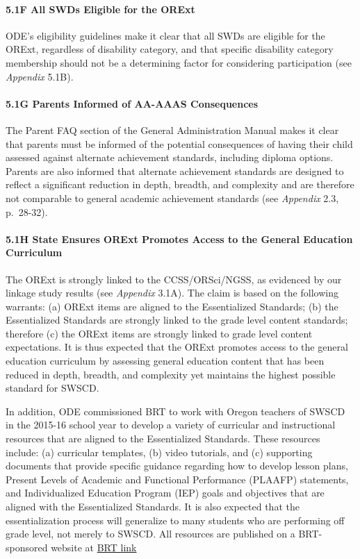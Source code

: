 \documentclass[]{article}
\let\oldparagraph\paragraph
\renewcommand{\paragraph}[1]{\oldparagraph{#1}\mbox{}}
\begin{document}
\paragraph{5.1F All SWDs Eligible for the
ORExt}\label{f-all-swds-eligible-for-the-orext}

ODE's eligibility guidelines make it clear that all SWDs are eligible
for the ORExt, regardless of disability category, and that specific
disability category membership should not be a determining factor for
considering participation (see \emph{Appendix} 5.1B).

\paragraph{5.1G Parents Informed of AA-AAAS
Consequences}\label{g-parents-informed-of-aa-aaas-consequences}

The Parent FAQ section of the General Administration Manual makes it
clear that parents must be informed of the potential consequences of
having their child assessed against alternate achievement standards,
including diploma options. Parents are also informed that alternate
achievement standards are designed to reflect a significant reduction in
depth, breadth, and complexity and are therefore not comparable to
general academic achievement standards (see \emph{Appendix} 2.3,
p.~28-32).

\paragraph{5.1H State Ensures ORExt Promotes Access to the General
Education
Curriculum}\label{h-state-ensures-orext-promotes-access-to-the-general-education-curriculum}

The ORExt is strongly linked to the CCSS/ORSci/NGSS, as evidenced by our
linkage study results (see \emph{Appendix} 3.1A). The claim is based on
the following warrants: (a) ORExt items are aligned to the Essentialized
Standards; (b) the Essentialized Standards are strongly linked to the
grade level content standards; therefore (c) the ORExt items are
strongly linked to grade level content expectations. It is thus expected
that the ORExt promotes access to the general education curriculum by
assessing general education content that has been reduced in depth,
breadth, and complexity yet maintains the highest possible standard for
SWSCD.

In addition, ODE commissioned BRT to work with Oregon teachers of SWSCD
in the 2015-16 school year to develop a variety of curricular and
instructional resources that are aligned to the Essentialized Standards.
These resources include: (a) curricular templates, (b) video tutorials,
and (c) supporting documents that provide specific guidance regarding
how to develop lesson plans, Present Levels of Academic and Functional
Performance (PLAAFP) statements, and Individualized Education Program
(IEP) goals and objectives that are aligned with the Essentialized
Standards. It is also expected that the essentialization process will
generalize to many students who are performing off grade level, not
merely to SWSCD. All resources are published on a BRT-sponsored website
at \color{link} \href{http://lms.brtprojects.org}{BRT link}
\color{black}
\end{document}
